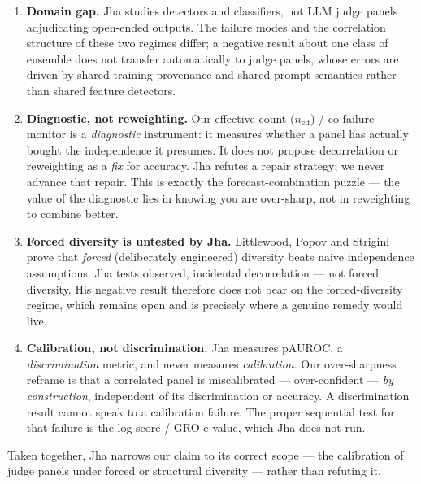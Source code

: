 \documentclass[11pt]{article}
\begin{document}
\begin{enumerate}[leftmargin=1.5em]
  \item \textbf{Domain gap.} Jha studies detectors and classifiers, not LLM judge panels adjudicating open-ended outputs. The failure modes and the correlation structure of these two regimes differ; a negative result about one class of ensemble does not transfer automatically to judge panels, whose errors are driven by shared training provenance and shared prompt semantics rather than shared feature detectors.

  \item \textbf{Diagnostic, not reweighting.} Our effective-count ($n_{\mathrm{eff}}$) / co-failure monitor is a \emph{diagnostic} instrument: it measures whether a panel has actually bought the independence it presumes. It does not propose decorrelation or reweighting as a \emph{fix} for accuracy. Jha refutes a repair strategy; we never advance that repair. This is exactly the forecast-combination puzzle --- the value of the diagnostic lies in knowing you are over-sharp, not in reweighting to combine better.

  \item \textbf{Forced diversity is untested by Jha.} Littlewood, Popov and Strigini prove that \emph{forced} (deliberately engineered) diversity beats naive independence assumptions. Jha tests observed, incidental decorrelation --- not forced diversity. His negative result therefore does not bear on the forced-diversity regime, which remains open and is precisely where a genuine remedy would live.

  \item \textbf{Calibration, not discrimination.} Jha measures pAUROC, a \emph{discrimination} metric, and never measures \emph{calibration}. Our over-sharpness reframe is that a correlated panel is miscalibrated --- over-confident --- \emph{by construction}, independent of its discrimination or accuracy. A discrimination result cannot speak to a calibration failure. The proper sequential test for that failure is the log-score / GRO e-value, which Jha does not run.
\end{enumerate}

Taken together, Jha narrows our claim to its correct scope --- the calibration of judge panels under forced or structural diversity --- rather than refuting it.
\end{document}
